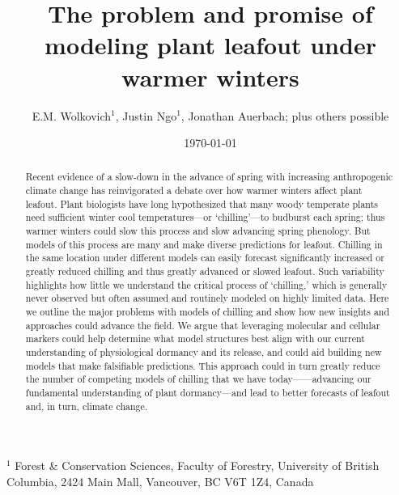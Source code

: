 \documentclass[11pt]{article}
\begin{document}
\renewcommand{\refname}{\CHead{}}


\title{The problem and promise of \\ modeling plant leafout under warmer winters} %
\author{E.M. Wolkovich$^1$, Justin Ngo$^1$, Jonathan Auerbach; plus others possible} %
\date{\today}
\maketitle

$^1$ Forest \& Conservation Sciences, Faculty of Forestry, University of British Columbia, 2424 Main Mall, Vancouver, BC V6T 1Z4, Canada\\


\begin{abstract}
Recent evidence of a slow-down in the advance of spring with increasing anthropogenic climate change has reinvigorated a debate over how warmer winters affect plant leafout. Plant biologists have long hypothesized that many woody temperate plants need sufficient winter cool temperatures---or `chilling'---to budburst each spring; thus warmer winters could slow this process and slow advancing spring phenology. But models of this process are many and make diverse predictions for leafout. Chilling in the same location under different models can easily forecast significantly increased or greatly reduced chilling and thus greatly advanced or slowed leafout. Such variability highlights how little we understand the critical process of `chilling,' which is generally never observed but often assumed and routinely modeled on highly limited data. Here we outline the major problems with models of chilling and show how new insights and approaches could advance the field.  We argue that leveraging molecular and cellular markers could help determine what model structures best align with our current understanding of physiological dormancy and its release, and could aid building new models that make falsifiable predictions. This approach could in turn greatly reduce the number of competing models of chilling that we have today------advancing our fundamental understanding of plant dormancy---and lead to better forecasts of leafout and, in turn, climate change. 
\end{abstract}
\end{document}
